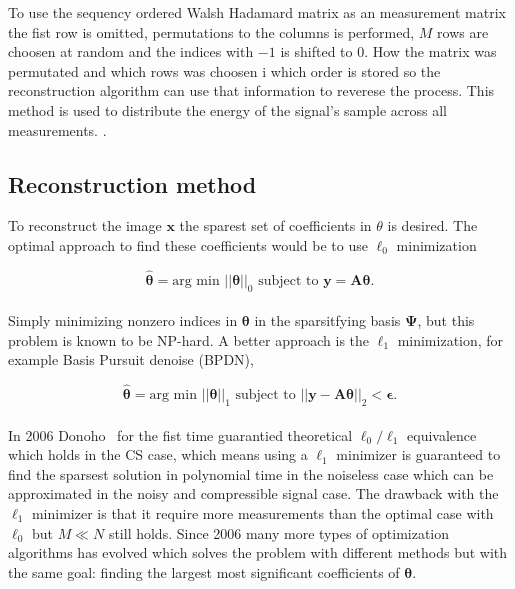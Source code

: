 To use the sequency ordered Walsh Hadamard matrix as an measurement matrix the fist row is omitted, permutations to the columns is performed, $M$ rows are choosen at random and the indices with $-1$ is shifted to $0$. How the matrix was permutated and which rows was choosen i which order is stored so the reconstruction algorithm can use that information to reverese the process. This method is used to distribute the energy of the signal's sample across all measurements.   \cite{article:SRM_long, article:TVAL3, article:an_improved_WH_matrix}. 


\subsection{Reconstruction method}
To reconstruct the image $\textbf{x}$ the sparest set of coefficients in $\theta$ is desired. The optimal approach to find these coefficients would be to use $\ell_0$ minimization


\begin{equation}
   \mathbf{ \hat{\theta}} = \text{arg min } ||\mathbf{\theta}||_0 \text{  subject to  } \mathbf{y = A\theta} \text{.}
\end{equation}\\[0.1in]


Simply minimizing nonzero indices in $\mathbf{\theta}$ in the sparsitfying basis $\mathbf{\Psi}$, but this problem is known to be NP-hard. A better approach is the $\ell_1$ minimization, for example Basis Pursuit denoise (BPDN),

\begin{equation}
    \mathbf{\hat{\theta}} = \text{arg min } ||\mathbf{\theta}||_1 \text{  subject to  } ||\mathbf{y - A\theta}||_2 < \mathbf{\epsilon} \text{.}
\end{equation}\\[0.1in]


In 2006 Donoho~\cite{article:CS_donoho1} for the fist time guarantied theoretical $\ell_0\text{/}\ell_1$ equivalence which holds in the CS case, which means using a $\ell_1$ minimizer is guaranteed to find the sparsest solution in polynomial time in the noiseless case which can be approximated in the noisy and compressible signal case. The drawback with the $\ell_1$ minimizer is that it require more measurements than the optimal case with $\ell_0$ but $M \ll N$ still holds. Since 2006 many more types of optimization algorithms has evolved which solves the problem with different methods but with the same goal: finding the largest most significant coefficients of $\mathbf{\theta}$. \cite{article:CS_donoho1, article:single_pixel_im_cs, article:a_new_ci_arc}


